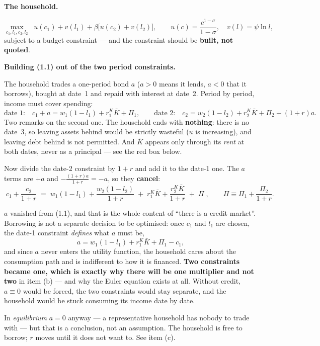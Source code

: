 \documentclass[11pt, a4paper]{article}
\newcommand{\passo}[1]{\medskip\noindent\textbf{#1}\par\nobreak}
\newcommand{\Kb}{\bar K}
\begin{document}
\passo{The household.}
\[
\max_{c_1,l_1,c_2,l_2}\;\; u(c_1)+v(l_1)+\beta\big[u(c_2)+v(l_2)\big],
\qquad u(c)=\frac{c^{1-\sigma}}{1-\sigma},\quad v(l)=\psi\ln l,
\]
subject to a budget constraint --- and the constraint should be \textbf{built, not quoted}.

\passo{Building (1.1) out of the two period constraints.} The household trades a
one-period bond $a$ ($a>0$ means it lends, $a<0$ that it borrows), bought at date~1 and
repaid with interest at date~2. Period by period, income must cover spending:
\[
\text{date 1:}\quad c_1+a=w_1(1-l_1)+r^K_1\Kb+\Pi_1 ,
\qquad
\text{date 2:}\quad c_2=w_2(1-l_2)+r^K_2\Kb+\Pi_2+(1+r)a .
\]
Two remarks on the second one. The household ends with \textbf{nothing}: there is no
date~3, so leaving assets behind would be strictly wasteful ($u$ is increasing), and
leaving debt behind is not permitted. And $\Kb$ appears only through its \emph{rent} at
both dates, never as a principal --- see the red box below.

Now divide the date-2 constraint by $1+r$ and add it to the date-1 one. The $a$ terms are
$+a$ and $-\frac{(1+r)a}{1+r}=-a$, so they \textbf{cancel}:
\[
\boxed{\;c_1+\frac{c_2}{1+r}\;=\;w_1(1-l_1)+\frac{w_2(1-l_2)}{1+r}
\;+\;r^K_1\Kb+\frac{r^K_2\Kb}{1+r}\;+\;\Pi\;},
\qquad \Pi\equiv\Pi_1+\frac{\Pi_2}{1+r} .
\tag{1.1}
\]

\begin{tcolorbox}[planbox, title={Where the bond went --- and why item (b) has only one $\lambda$}]
\small
$a$ vanished from (1.1), and that is the whole content of ``there is a credit market''.
Borrowing is not a separate decision to be optimised: once $c_1$ and $l_1$ are chosen, the
date-1 constraint \emph{defines} what $a$ must be,
\[
a=w_1(1-l_1)+r^K_1\Kb+\Pi_1-c_1 ,
\]
and since $a$ never enters the utility function, the household cares about the consumption
path and is indifferent to how it is financed. \textbf{Two constraints became one, which is
exactly why there will be one multiplier and not two} in item (b) --- and why the Euler
equation exists at all. Without credit, $a\equiv0$ would be forced, the two constraints
would stay separate, and the household would be stuck consuming its income date by date.

\smallskip
In \emph{equilibrium} $a=0$ anyway --- a representative household has nobody to trade with
--- but that is a conclusion, not an assumption. The household is free to borrow; $r$ moves
until it does not want to. See item (c).
\end{tcolorbox}
\end{document}
